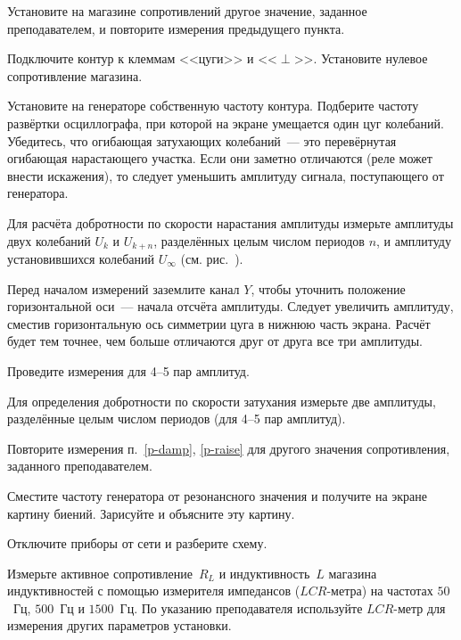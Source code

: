 \begin{lab:task}
	\item Установите на магазине сопротивлений другое значение, заданное
преподавателем, и повторите измерения предыдущего пункта. 


	\item Подключите контур к клеммам <<цуги>> и <<$\perp$>>. 
    Установите нулевое сопротивление магазина.

	\item Установите на генераторе собственную частоту контура. Подберите частоту 
    развёртки осциллографа, при которой на экране умещается один цуг колебаний. 
    Убедитесь, что огибающая затухающих колебаний~--- это перевёрнутая огибающая 
    нарастающего участка. Если они заметно отличаются (реле может внести искажения), 
    то следует уменьшить амплитуду сигнала, поступающего от генератора.

	\item \label{p-damp} Для расчёта добротности по скорости нарастания амплитуды измерьте
амплитуды двух колебаний $U_k$ и $U_{k+n}$, разделённых целым числом периодов $n$,
и амплитуду установившихся колебаний $U_{\infty}$ 
(см. рис.~).

Перед началом измерений заземлите канал $Y$, чтобы уточнить положение 
горизонтальной оси~--- начала отсчёта амплитуды. 
Следует увеличить амплитуду, сместив горизонтальную ось симметрии цуга в нижнюю часть 
экрана. Расчёт будет тем точнее, чем больше отличаются друг от друга все 
три амплитуды.

Проведите измерения для 4--5 пар амплитуд.

	\item \label{p-raise} Для определения добротности по скорости затухания измерьте две
амплитуды, разделённые целым числом периодов (для 4--5 пар амплитуд).

	\item Повторите измерения п.~\ref{p-damp}, \ref{p-raise} для другого 
    значения сопротивления, заданного преподавателем.

	\item Сместите частоту генератора от резонансного значения и получите на
экране картину биений. Зарисуйте и объясните эту картину.

	\item Отключите приборы от сети и разберите схему.

	\item Измерьте активное сопротивление~$R_L$ и индуктивность~$L$ магазина
индуктивностей с помощью измерителя импедансов ($LCR$-метра) 
на частотах $50$~Гц, $500$~Гц и $1500$~Гц. По указанию преподавателя 
используйте $LCR$-метр для измерения других параметров установки.


\end{lab:task}
